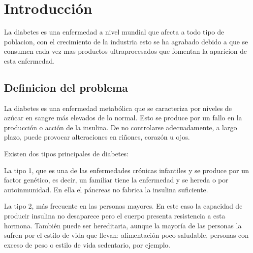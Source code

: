 \section{Introducción}





La diabetes es una enfermedad a nivel mundial que afecta a todo tipo de poblacion, con el crecimiento de la industria esto se ha agrabado debido a que se consumen cada vez mas productos ultraprocesados que fomentan la aparicion de esta enfermedad.

\vspace{0.50cm}

\subsection{Definicion del problema}


La diabetes es una enfermedad metabólica que se caracteriza por niveles de azúcar en sangre más elevados de lo normal. Esto se produce por un fallo en la producción o acción de la insulina. De no controlarse adecuadamente, a largo plazo, puede provocar alteraciones en riñones, corazón u ojos.

\vspace{0.50cm}

Existen dos tipos principales de diabetes:
\vspace{0.50cm}

La tipo 1, que es una de las enfermedades crónicas infantiles y se produce por un factor genético, es decir, un familiar tiene la enfermedad y se hereda o por autoinmunidad. En ella el páncreas no fabrica la insulina suficiente.
\vspace{0.50cm}

La tipo 2, más frecuente en las personas mayores. En este caso la capacidad de producir insulina no desaparece pero el cuerpo presenta resistencia a esta hormona. También puede ser hereditaria, aunque la mayoría de las personas la sufren por el estilo de vida que llevan: alimentación poco saludable, personas con exceso de peso o estilo de vida sedentario, por ejemplo.
\vspace{0.50cm}

